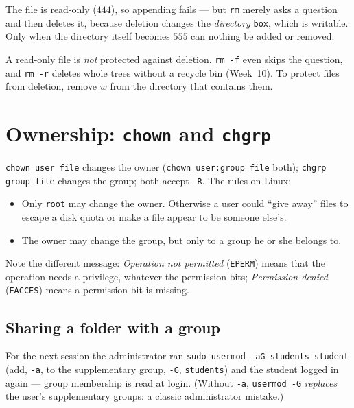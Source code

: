 \documentclass[11pt,a4paper]{article}
\newcommand{\cmd}[1]{\texttt{#1}}
\begin{document}


The file is read-only ($444$), so appending fails --- but \cmd{rm} merely asks a question and then deletes it, because deletion changes the \emph{directory} \texttt{box}, which is writable. Only when the directory itself becomes $555$ can nothing be added or removed.

\begin{keyidea}
A read-only file is \emph{not} protected against deletion. \texttt{rm -f} even skips the question, and \texttt{rm -r} deletes whole trees without a recycle bin (Week~10). To protect files from deletion, remove $w$ from the directory that contains them.
\end{keyidea}

\section{Ownership: \cmd{chown} and \cmd{chgrp}}
\label{sec:own}

\cmd{chown user file} changes the owner (\cmd{chown user:group file} both); \cmd{chgrp group file} changes the group; both accept \texttt{-R}. The rules on Linux:
\begin{itemize}
  \item Only \texttt{root} may change the owner. Otherwise a user could ``give away'' files to escape a disk quota or make a file appear to be someone else's.
  \item The owner may change the group, but only to a group he or she belongs to.
\end{itemize}



Note the different message: \emph{Operation not permitted} (\texttt{EPERM}) means that the operation needs a privilege, whatever the permission bits; \emph{Permission denied} (\texttt{EACCES}) means a permission bit is missing.

\subsection{Sharing a folder with a group}

For the next session the administrator ran \cmd{sudo usermod -aG students student} (add, \texttt{-a}, to the supplementary group, \texttt{-G}, \texttt{students}) and the student logged in again --- group membership is read at login. (Without \texttt{-a}, \cmd{usermod -G} \emph{replaces} the user's supplementary groups: a classic administrator mistake.)
\end{document}
